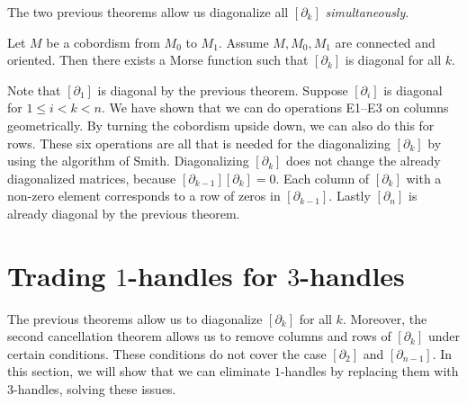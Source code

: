 The two previous theorems allow us diagonalize all $[\partial_k]$ \emph{simultaneously}.
\begin{theorem}
    Let $M$ be a cobordism from  $ M_0$ to $M_{1}$.
    Assume $M, M_0, M_1$ are connected and oriented.
    Then there exists a Morse function such that $[\partial_k]$ is diagonal for all $k$.
\end{theorem}
\begin{myproof}
    Note that $[\partial_1]$ is diagonal by the previous theorem.
    Suppose $[\partial_i]$ is diagonal for  $1 \le  i < k < n$.
    We have shown that we can do operations E1--E3 on columns geometrically.
    By turning the cobordism upside down, we can also do this for rows.
    These six operations are all that is needed for the diagonalizing $[\partial_k]$ by using the algorithm of Smith.
    Diagonalizing $[\partial_k]$ does not change the already diagonalized matrices, because  $[\partial_{k-1}][\partial_k] = 0$. Each column of $[\partial_k]$ with a non-zero element corresponds to a row of zeros in  $[\partial_{k-1}]$.
    Lastly $[\partial_n]$ is already diagonal by the previous theorem.
\end{myproof}



\section{Trading $1$-handles for $3$-handles}
The previous theorems allow us to diagonalize $[\partial_k]$ for all $k$.
Moreover, the second cancellation theorem allows us to remove columns and rows of $[\partial_k]$ under certain conditions.
These conditions do not cover the case $[\partial_2]$ and $[\partial_{n-1}]$.
In this section, we will show that we can eliminate $1$-handles by replacing them with $3$-handles, solving these issues.


